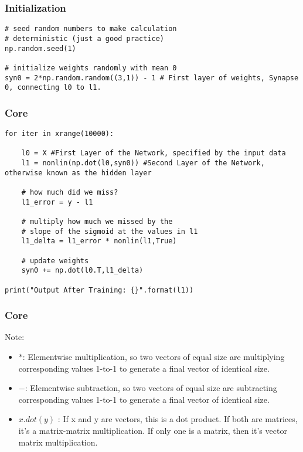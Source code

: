 \begin{frame}[fragile] \frametitle{Initialization}

\begin{lstlisting}
# seed random numbers to make calculation
# deterministic (just a good practice)
np.random.seed(1)

# initialize weights randomly with mean 0
syn0 = 2*np.random.random((3,1)) - 1 # First layer of weights, Synapse 0, connecting l0 to l1.
\end{lstlisting}
\end{frame}


\begin{frame}[fragile] \frametitle{Core}

\begin{lstlisting}
for iter in xrange(10000):

    l0 = X #First Layer of the Network, specified by the input data
    l1 = nonlin(np.dot(l0,syn0)) #Second Layer of the Network, otherwise known as the hidden layer

    # how much did we miss?
    l1_error = y - l1

    # multiply how much we missed by the 
    # slope of the sigmoid at the values in l1
    l1_delta = l1_error * nonlin(l1,True) 

    # update weights
    syn0 += np.dot(l0.T,l1_delta)

print("Output After Training: {}".format(l1))
\end{lstlisting}
\end{frame}

\begin{frame}[fragile] \frametitle{Core}
Note:
\begin{itemize}
\item $*$: Elementwise multiplication, so two vectors of equal size are multiplying corresponding values 1-to-1 to generate a final vector of identical size.
\item $-$:  Elementwise subtraction, so two vectors of equal size are subtracting corresponding values 1-to-1 to generate a final vector of identical size.
\item $x.dot(y)$ : If x and y are vectors, this is a dot product. If both are matrices, it's a matrix-matrix multiplication. If only one is a matrix, then it's vector matrix multiplication.
\end{itemize}
\end{frame}



